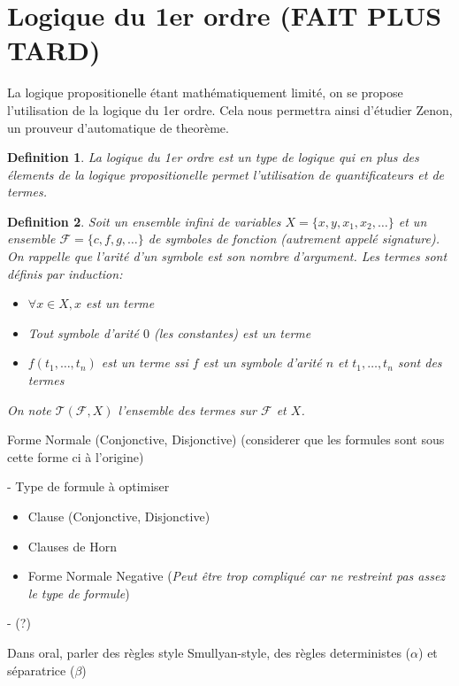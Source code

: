 \documentclass{paper}
\newtheorem{defi}{Definition}
\begin{document}
\section{Logique du 1er ordre (FAIT PLUS TARD)}
La logique propositionelle étant mathématiquement limité, on se propose l'utilisation de la logique du 1er ordre.
Cela nous permettra ainsi d'étudier Zenon, un prouveur d'automatique de theorème.
\begin{defi}
    La \textit{logique du 1er ordre} est un type de logique qui en plus des élements de la logique propositionelle permet l'utilisation de
    quantificateurs et de \textit{termes}.
\end{defi}

\begin{defi}
    Soit un ensemble infini de variables $X = \{x,y,x_1,x_2,\dots \}$ et un ensemble $\mathcal{F}=\{c,f,g,\dots \}$ de symboles de fonction (autrement appelé signature).
    On rappelle que l'arité d'un symbole est son nombre d'argument.
    Les termes sont définis par induction:
    \begin{itemize}
        \item $\forall x\in X, x$ est un terme
        \item Tout symbole d'arité $0$ (les constantes) est un terme
        \item $f(t_1,\dots,t_n)$ est un terme ssi $f$ est un symbole d'arité $n$ et $t_1,\dots,t_n$ sont des termes
    \end{itemize} 
    On note $\mathcal{T}(\mathcal{F}, X)$ l'ensemble des termes sur $\mathcal{F}$ et $X$.
\end{defi}

Forme Normale (Conjonctive, Disjonctive) (considerer que les formules sont sous cette forme ci à l'origine)

- Type de formule à optimiser
\begin{itemize}
    \item Clause (Conjonctive, Disjonctive)
    \item Clauses de Horn
    \item Forme Normale Negative (\textit{Peut être trop compliqué car ne restreint pas assez le type de formule})
\end{itemize}

-  (?)


Dans oral, parler des règles style Smullyan-style, des règles deterministes ($\alpha$) et séparatrice ($\beta$)
\end{document}
